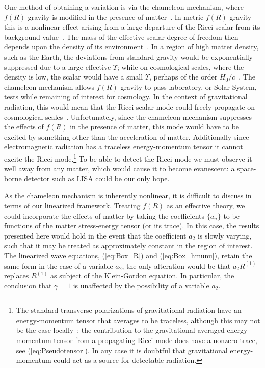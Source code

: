 \documentclass[aps,prd,amsfonts,amssymb,amsmath,nofootinbib,reprint,showpacs]{revtex4-1}
\newcommand{\eqnref}[1]{(\ref{eq:#1})}
\begin{document}
One method of obtaining a variation is via the chameleon mechanism, where $f(R)$-gravity is modified in the presence of matter~\cite{Khoury2004, Khoury2004a, Brax2004}. In metric $f(R)$-gravity this is a nonlinear effect arising from a large departure of the Ricci scalar from its background value~\cite{DeFelice2010}. The mass of the effective scalar degree of freedom then depends upon the density of its environment~\cite{Faulkner2007, Li2007}. In a region of high matter density, such as the Earth, the deviations from standard gravity would be exponentially suppressed due to a large effective $\Upsilon$; while on cosmological scales, where the density is low, the scalar would have a small $\Upsilon$, perhaps of the order $H_0/c$~\cite{Khoury2004, Khoury2004a}. The chameleon mechanism allows $f(R)$-gravity to pass laboratory, or Solar System, tests while remaining of interest for cosmology. In the context of gravitational radiation, this would mean that the Ricci scalar mode could freely propagate on cosmological scales~\cite{Corda2009}. Unfortunately, since the chameleon mechanism suppresses the effects of $f(R)$ in the presence of matter, this mode would have to be excited by something other than the acceleration of matter. Additionally since electromagnetic radiation has a traceless energy-momentum tensor it cannot excite the Ricci mode.\footnote{The standard transverse polarizations of gravitational radiation have an energy-momentum tensor that averages to be traceless, although this may not be the case locally~\cite{Butcher2010}; the contribution to the gravitational averaged energy-momentum tensor from a propagating Ricci mode does have a nonzero trace, see \eqnref{Pseudotensor}. In any case it is doubtful that gravitational energy-momentum could act as a source for detectable radiation.} To be able to detect the Ricci mode we must observe it well away from any matter, which would cause it to become evanescent: a space-borne detector such as LISA could be our only hope.

As the chameleon mechanism is inherently nonlinear, it is difficult to discuss in terms of our linearized framework. Treating $f(R)$ as an effective theory, we could incorporate the effects of matter by taking the coefficients $\{a_n\}$ to be functions of the matter stress-energy tensor (or its trace). In this case, the results presented here would hold in the event that the coefficient $a_2$ is slowly varying, such that it may be treated as approximately constant in the region of interest. The linearized wave equations, \eqnref{Box_R} and \eqnref{Box_hmunu}, retain the same form in the case of a variable $a_2$, the only alteration would be that $a_2 R^{(1)}$ replaces $R^{(1)}$ as subject of the Klein-Gordon equation. In particular, the conclusion that $\gamma =1$ is unaffected by the possibility of a variable $a_2$.
\end{document}
